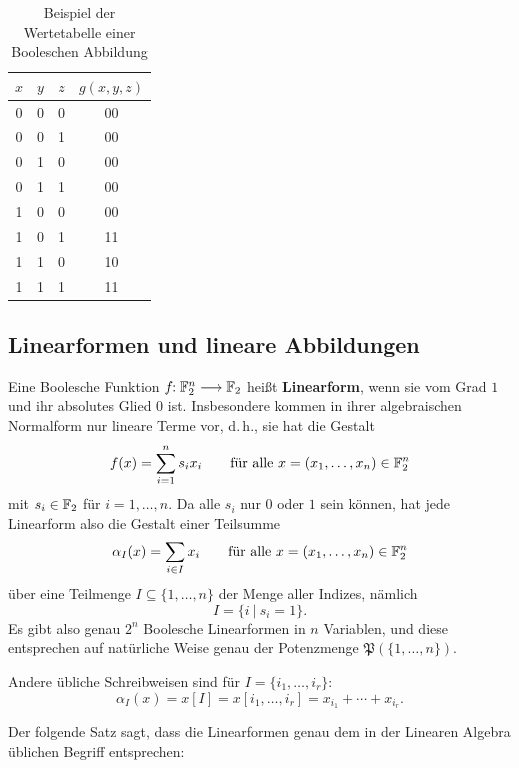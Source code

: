 \begin{refsegment}
\begin{table}[hbpt]
\begin{center}
\begin{tabular}{|ccc|c|} \hline
   $x$ & $y$ & $z$ & $g(x,y,z)$ \\ \hline
    0  &  0  &  0  &  00  \\
    0  &  0  &  1  &  00  \\
    0  &  1  &  0  &  00  \\
    0  &  1  &  1  &  00  \\
    1  &  0  &  0  &  00  \\
    1  &  0  &  1  &  11  \\
    1  &  1  &  0  &  10  \\
    1  &  1  &  1  &  11  \\
   \hline
\end{tabular}
\end{center}
\caption{Beispiel der Wertetabelle einer Booleschen Abbildung}\label{tab-bool-wta}
\end{table}

\subsection{Linearformen und lineare Abbildungen}\label{ss-bool-lin}

Eine Boolesche Funktion $f\!\!: \mathbb{F}_2^n \longrightarrow \mathbb{F}_2$ heißt
{\bf Linearform}, wenn sie vom Grad $1$ und ihr absolutes Glied $0$ ist.
Insbesondere kommen in ihrer algebraischen Normalform nur lineare
Terme vor, d.\,h., sie hat die Gestalt
\[
  f(x) = \sum_{i=1}^n s_i x_i \qquad\textrm{für alle }
  x = (x_1,\ldots,x_n) \in \mathbb{F}_2^n
\]
mit $s_i \in \mathbb{F}_2$ für $i = 1, \ldots, n$. Da alle $s_i$ nur $0$ oder $1$
sein können, hat jede Linearform also die Gestalt einer Teilsumme
\[
  \alpha_I(x) = \sum_{i\in I} x_i \qquad\textrm{für alle }
  x = (x_1,\ldots,x_n) \in \mathbb{F}_2^n
\]
über eine Teilmenge $I \subseteq \{1,\ldots,n\}$
der Menge aller Indizes, nämlich
\[
     I = \{i \:|\: s_i = 1\}.
\]
Es gibt also genau $2^n$ Boolesche
Linearformen in $n$ Variablen, und diese entsprechen auf natürliche
Weise genau der Potenzmenge $\mathfrak{P}(\{1,\ldots,n\})$.

Andere übliche Schreibweisen sind für $I = \{i_1,\ldots,i_r\}$:
\[
  \alpha_I(x) = x[I] = x[i_1,\ldots,i_r] = x_{i_1} + \cdots + x_{i_r}.
\]

Der folgende Satz sagt, dass die Linearformen genau dem in der
Linearen Algebra üblichen Begriff entsprechen:


\end{refsegment}
